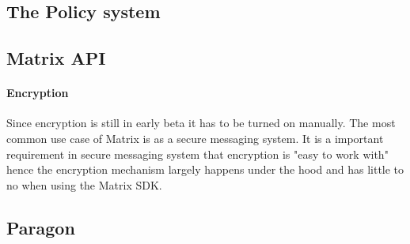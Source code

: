 



\subsection{The Policy system}

\subsection{Matrix API}


\paragraph{Encryption}
Since encryption is still in early beta it has to be turned on manually. The most common use case of Matrix is as a secure messaging system. It is a important requirement in secure messaging system that encryption is "easy to work with" hence the encryption mechanism largely happens under the hood and has little to no when using the Matrix SDK.



\subsection{Paragon}


